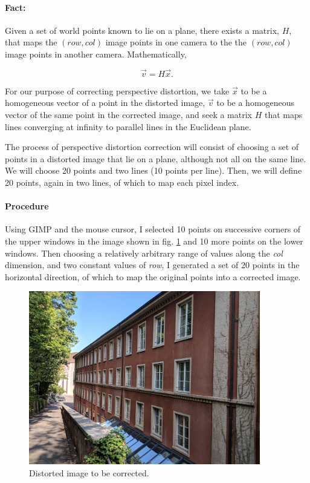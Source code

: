 \documentclass[11pt,a4paper]{article}
\begin{document}
\paragraph{Fact:} Given a set of world points known to lie on a plane, there exists a matrix, $H$, that maps the $(row, col)$ image points in one camera to the the $(row, col)$ image points in another camera. Mathematically,

\begin{equation} \label{eq:hmap}
\vec{v} = H\vec{x}.
\end{equation}

For our purpose of correcting perspective distortion, we take $\vec{x}$ to be a homogeneous vector of a point in the distorted image, $\vec{v}$ to be a homogeneous vector of the same point in the corrected image, and seek a matrix $H$ that maps lines converging at infinity to parallel lines in the Euclidean plane. 

The process of perspective distortion correction will consist of choosing a set of points in a distorted image that lie on a plane, although not all on the same line. We will choose 20 points and two lines (10 points per line). Then, we will define 20 points, again in two lines, of which to map each pixel index. 

\pagebreak

\paragraph{Procedure} Using GIMP and the mouse cursor, I selected 10 points on successive corners of the upper windows in the image shown in fig. \ref{fig:distorted} and 10 more points on the lower windows. Then choosing a relatively arbitrary range of values along the \textit{col} dimension, and two constant values of \textit{row}, I generated a set of 20 points in the horizontal direction, of which to map the original points into a corrected image. 

\begin{figure}[ht]
	\centering
	\includegraphics[width=0.9\textwidth]{PC_test_2}
	\caption{Distorted image to be corrected.}
	\label{fig:distorted}
\end{figure}
\end{document}
